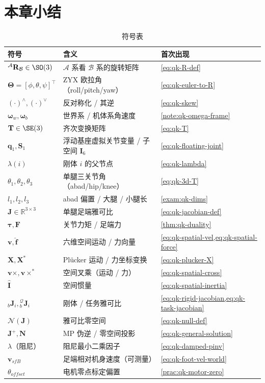 \section*{本章小结}

\begin{table}[H]\centering\small
\caption{符号表}
\begin{tabular}{lll}
\toprule
符号 & 含义 & 首次出现 \\
\midrule
${}^{\mathcal{A}}\mathbf{R}_{\mathcal{B}}\in\SO(3)$ & $\mathcal{A}$ 系看 $\mathcal{B}$ 系的旋转矩阵 & \cref{eq:qk-R-def} \\
$\boldsymbol{\Theta}=[\phi,\theta,\psi]^\top$ & ZYX 欧拉角（roll/pitch/yaw） & \cref{eq:qk-euler-to-R} \\
$(\cdot)^\wedge,(\cdot)^\vee$ & 反对称化 / 其逆 & \cref{eq:qk-skew} \\
$\boldsymbol{\omega}_w,\boldsymbol{\omega}_b$ & 世界系 / 机体系角速度 & \cref{note:qk-omega-frame} \\
$\mathbf{T}\in\SE(3)$ & 齐次变换矩阵 & \cref{eq:qk-T} \\
$\boldsymbol{q}_1,\mathbf{S}_1$ & 浮动基座虚拟关节变量 / 子空间 $\mathbf{I}_6$ & \cref{eq:qk-floating-joint} \\
$\lambda(i)$ & 刚体 $i$ 的父节点 & \cref{eq:qk-lambda} \\
$\theta_1,\theta_2,\theta_3$ & 单腿三关节角（abad/hip/knee） & \cref{eq:qk-3d-T} \\
$l_1,l_2,l_3$ & abad 偏置 / 大腿 / 小腿长 & \cref{exam:qk-dims} \\
$\mathbf{J}\in\mathbb{R}^{3\times3}$ & 单腿足端雅可比 & \cref{eq:qk-jacobian-def} \\
$\boldsymbol{\tau},\mathbf{F}$ & 关节力矩 / 足端力 & \cref{thm:qk-duality} \\
$\boldsymbol{v},\hat{\boldsymbol{f}}$ & 六维空间运动 / 力向量 & \cref{eq:qk-spatial-vel,eq:qk-spatial-force} \\
$\mathbf{X},\mathbf{X}^{*}$ & Plücker 运动 / 力坐标变换 & \cref{eq:qk-plucker-X} \\
$\boldsymbol{v}\times,\boldsymbol{v}\times^{*}$ & 空间叉乘（运动 / 力） & \cref{eq:qk-spatial-cross} \\
$\hat{\mathbf{I}}$ & 空间惯量 & \cref{eq:qk-spatial-inertia} \\
${}_{b}\mathbf{J}_i,{}_{b}^{\mathcal{Q}}\mathbf{J}_i$ & 刚体 / 任务雅可比 & \cref{eq:qk-rigid-jacobian,eq:qk-task-jacobian} \\
$\mathcal{N}(\mathbf{J})$ & 雅可比零空间 & \cref{eq:qk-null-def} \\
$\mathbf{J}^{+},\mathbf{N}$ & MP 伪逆 / 零空间投影 & \cref{eq:qk-general-solution} \\
$\lambda$（阻尼） & 阻尼最小二乘因子 & \cref{eq:qk-damped-pinv} \\
$\boldsymbol{v}_{sfB}$ & 足端相对机身速度（可测量） & \cref{eq:qk-foot-vel-world} \\
$\theta_{offset}$ & 电机零点标定偏置 & \cref{prac:qk-motor-zero} \\
\bottomrule
\end{tabular}
\end{table}

